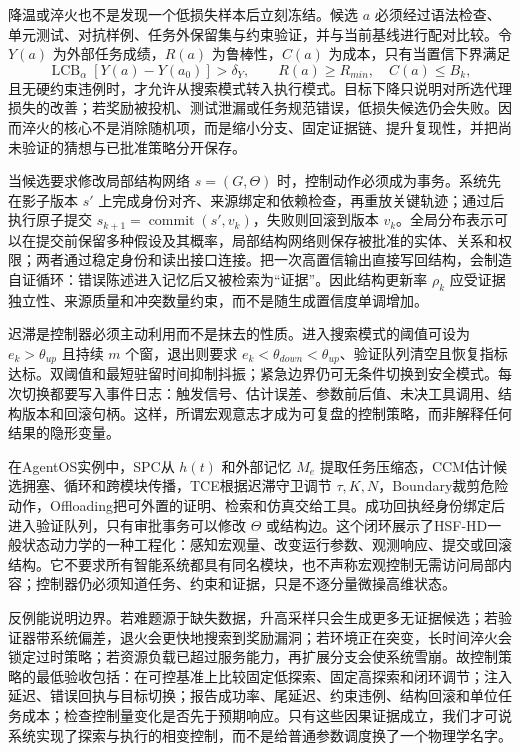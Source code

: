 降温或淬火也不是发现一个低损失样本后立刻冻结。候选 $a$ 必须经过语法检查、单元测试、对抗样例、任务外保留集与约束验证，并与当前基线进行配对比较。令 $Y(a)$ 为外部任务成绩，$R(a)$ 为鲁棒性，$C(a)$ 为成本，只有当置信下界满足
\[
 \operatorname{LCB}_\alpha[Y(a)-Y(a_0)]>\delta_Y,
 \qquad R(a)\ge R_{min},\quad C(a)\le B_k,
\]
且无硬约束违例时，才允许从搜索模式转入执行模式。目标下降只说明对所选代理损失的改善；若奖励被投机、测试泄漏或任务规范错误，低损失候选仍会失败。因而淬火的核心不是消除随机项，而是缩小分支、固定证据链、提升复现性，并把尚未验证的猜想与已批准策略分开保存。

当候选要求修改局部结构网络 $s=(G,\Theta)$ 时，控制动作必须成为事务。系统先在影子版本 $s'$ 上完成身份对齐、来源绑定和依赖检查，再重放关键轨迹；通过后执行原子提交 $s_{k+1}=\operatorname{commit}(s',v_k)$，失败则回滚到版本 $v_k$。全局分布表示可以在提交前保留多种假设及其概率，局部结构网络则保存被批准的实体、关系和权限；两者通过稳定身份和读出接口连接。把一次高置信输出直接写回结构，会制造自证循环：错误陈述进入记忆后又被检索为“证据”。因此结构更新率 $\rho_k$ 应受证据独立性、来源质量和冲突数量约束，而不是随生成置信度单调增加。

迟滞是控制器必须主动利用而不是抹去的性质。进入搜索模式的阈值可设为 $e_k>\theta_{up}$ 且持续 $m$ 个窗，退出则要求 $e_k<\theta_{down}<\theta_{up}$、验证队列清空且恢复指标达标。双阈值和最短驻留时间抑制抖振；紧急边界仍可无条件切换到安全模式。每次切换都要写入事件日志：触发信号、估计误差、参数前后值、未决工具调用、结构版本和回滚句柄。这样，所谓宏观意志才成为可复盘的控制策略，而非解释任何结果的隐形变量。

在AgentOS实例中，SPC从 $h(t)$ 和外部记忆 $M_e$ 提取任务压缩态，CCM估计候选拥塞、循环和跨模块传播，TCE根据迟滞守卫调节 $\tau,K,N$，Boundary裁剪危险动作，Offloading把可外置的证明、检索和仿真交给工具。成功回执经身份绑定后进入验证队列，只有审批事务可以修改 $\Theta$ 或结构边。这个闭环展示了HSF-HD一般状态动力学的一种工程化：感知宏观量、改变运行参数、观测响应、提交或回滚结构。它不要求所有智能系统都具有同名模块，也不声称宏观控制无需访问局部内容；控制器仍必须知道任务、约束和证据，只是不逐分量微操高维状态。

反例能说明边界。若难题源于缺失数据，升高采样只会生成更多无证据候选；若验证器带系统偏差，退火会更快地搜索到奖励漏洞；若环境正在突变，长时间淬火会锁定过时策略；若资源负载已超过服务能力，再扩展分支会使系统雪崩。故控制策略的最低验收包括：在可控基准上比较固定低探索、固定高探索和闭环调节；注入延迟、错误回执与目标切换；报告成功率、尾延迟、约束违例、结构回滚和单位任务成本；检查控制量变化是否先于预期响应。只有这些因果证据成立，我们才可说系统实现了探索与执行的相变控制，而不是给普通参数调度换了一个物理学名字。

